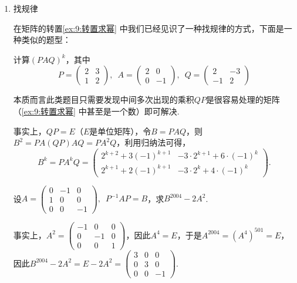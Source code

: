 \begin{enumerate}
    \item 找规律

          在矩阵的转置\autoref{ex:9:转置求幂} 中我们已经见识了一种找规律的方式，下面是一种类似的题型：
          \begin{example}
              计算$(PAQ)^k$，其中
              \[P=\begin{pmatrix}2 & 3 \\ 1 & 2\end{pmatrix},\enspace A=\begin{pmatrix}2 & 0 \\ 0 & -1\end{pmatrix},\enspace Q=\begin{pmatrix}2 & -3 \\ -1 & 2\end{pmatrix}\]
          \end{example}
          本质而言此类题目只需要发现中间多次出现的乘积$QP$是很容易处理的矩阵（\autoref{ex:9:转置求幂} 中甚至是一个数）即可解决.

          \begin{solution}
            事实上，$QP=E$（$E$是单位矩阵），令$B=PAQ$，则
            $B^2=PA(QP)AQ=PA^2Q$，利用归纳法可得，
            \[B^k=PA^kQ=\begin{pmatrix}
                2^{k+2}+3(-1)^{k+1} & -3\cdot 2^{k+1}+6\cdot (-1)^k \\
                2^{k+1}+2(-1)^{k+1} & -3\cdot 2^k+4\cdot (-1)^k
            \end{pmatrix}.\]
          \end{solution}

          \begin{example}
              设$A=\begin{pmatrix}0 & -1 & 0 \\ 1 & 0 & 0 \\ 0 & 0 & -1 \end{pmatrix},\enspace P^{-1}AP=B$，求$B^{2004}-2A^2$.
          \end{example}
          \begin{solution}
            事实上，$A^2=\begin{pmatrix}
                -1 & 0 & 0 \\ 0 & -1 & 0 \\ 0 & 0 & 1
            \end{pmatrix}$，因此$A^4=E$，于是$A^{2004}=(A^4)^{501}=E$，因此$B^{2004}-2A^2=E-2A^2=\begin{pmatrix}
                3 & 0 & 0 \\ 0 & 3  & 0 \\ 0 & 0 & -1
            \end{pmatrix}$.
          \end{solution}


\end{enumerate}
